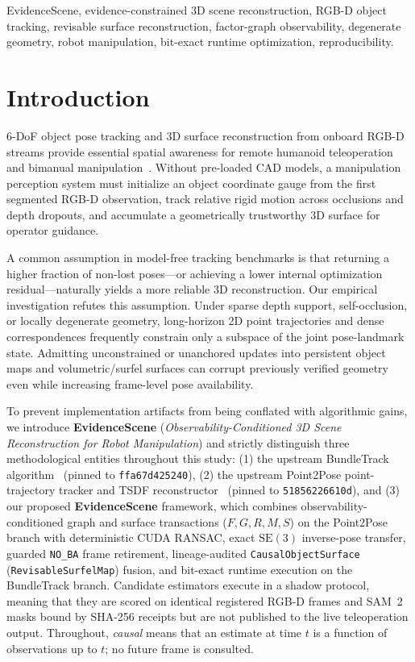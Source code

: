 \documentclass[10pt,journal]{IEEEtran}
\begin{document}
\begin{IEEEkeywords}
EvidenceScene, evidence-constrained 3D scene reconstruction, RGB-D object tracking, revisable surface reconstruction, factor-graph observability, degenerate geometry, robot manipulation, bit-exact runtime optimization, reproducibility.
\end{IEEEkeywords}

\section{Introduction}
\label{sec:intro}

 6-DoF object pose tracking and 3D surface reconstruction from onboard RGB-D streams provide essential spatial awareness for remote humanoid teleoperation and bimanual manipulation~\cite{bundletrack,bundlesdf,point2pose}. Without pre-loaded CAD models, a manipulation perception system must initialize an object coordinate gauge from the first segmented RGB-D observation, track relative rigid motion across occlusions and depth dropouts, and accumulate a geometrically trustworthy 3D surface for operator guidance.

A common assumption in model-free tracking benchmarks is that returning a higher fraction of non-lost poses---or achieving a lower internal optimization residual---naturally yields a more reliable 3D reconstruction. Our empirical investigation refutes this assumption. Under sparse depth support, self-occlusion, or locally degenerate geometry, long-horizon 2D point trajectories and dense correspondences frequently constrain only a subspace of the joint pose-landmark state. Admitting unconstrained or unanchored updates into persistent object maps and volumetric/surfel surfaces can corrupt previously verified geometry even while increasing frame-level pose availability.

To prevent implementation artifacts from being conflated with algorithmic gains, we introduce \textbf{EvidenceScene} (\emph{Observability-Conditioned 3D Scene Reconstruction for Robot Manipulation}) and strictly distinguish three methodological entities throughout this study: (1) the upstream BundleTrack algorithm~\cite{bundletrack} (pinned to \texttt{ffa67d425240}), (2) the upstream Point2Pose point-trajectory tracker and TSDF reconstructor~\cite{point2pose} (pinned to \texttt{51856226610d}), and (3) our proposed \textbf{EvidenceScene} framework, which combines observability-conditioned graph and surface transactions ($F,G,R,M,S$) on the Point2Pose branch with deterministic CUDA RANSAC, exact $\mathrm{SE}(3)$ inverse-pose transfer, guarded \texttt{NO\_BA} frame retirement, lineage-audited \texttt{CausalObjectSurface} (\texttt{RevisableSurfelMap}) fusion, and bit-exact runtime execution on the BundleTrack branch. Candidate estimators execute in a shadow protocol, meaning that they are scored on identical registered RGB-D frames and SAM~2~\cite{ravi2024sam2} masks bound by SHA-256 receipts but are not published to the live teleoperation output. Throughout, \emph{causal} means that an estimate at time $t$ is a function of observations up to $t$; no future frame is consulted.
\end{document}
